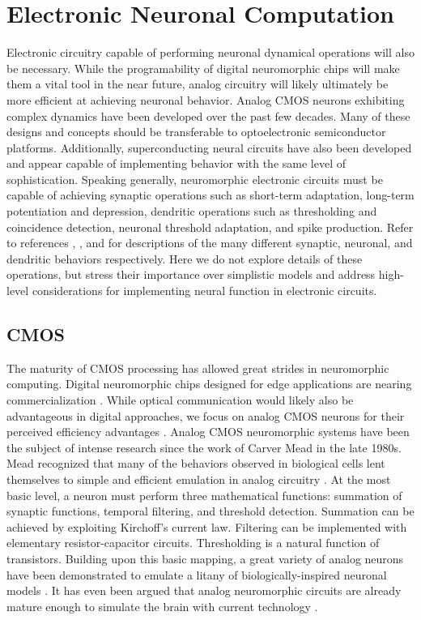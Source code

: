 \documentclass[twocolumn]{article}
\begin{document}
\section{\label{sec:soma}Electronic Neuronal Computation}
Electronic circuitry capable of performing neuronal dynamical operations will also be necessary. While the programability of digital neuromorphic chips will make them a vital tool in the near future, analog circuitry will likely ultimately be more efficient at achieving neuronal behavior. Analog CMOS neurons exhibiting complex dynamics have been developed over the past few decades. Many of these designs and concepts should be transferable to optoelectronic semiconductor platforms. Additionally, superconducting neural circuits have also been developed and appear capable of implementing behavior with the same level of sophistication. Speaking generally, neuromorphic electronic circuits must be capable of achieving synaptic operations such as short-term adaptation, long-term potentiation and depression, dendritic operations such as thresholding and coincidence detection, neuronal threshold adaptation, and spike production. Refer to references \cite{citri2008synaptic}, \cite{miller2019combined, zenke2013synaptic}, and \cite{payeur2019classes} for descriptions of the many different synaptic, neuronal, and dendritic behaviors respectively. Here we do not explore details of these operations, but stress their importance over simplistic models and address high-level considerations for implementing neural function in electronic circuits. 

\subsection{CMOS}
The maturity of CMOS processing has allowed great strides in neuromorphic computing. Digital neuromorphic chips designed for edge applications are nearing commercialization \cite{davies2018loihi, merolla2014million}. While optical communication would likely also be advantageous in digital approaches, we focus on analog CMOS neurons for their perceived efficiency advantages \cite{rajendran2012specifications, mead1990neuromorphic}. Analog CMOS neuromorphic systems have been the subject of intense research since the work of Carver Mead in the late 1980s. Mead recognized that many of the behaviors observed in biological cells lent themselves to simple and efficient emulation in analog circuitry \cite{mead1990neuromorphic}. At the most basic level, a neuron must perform three mathematical functions: summation of synaptic functions, temporal filtering, and threshold detection. Summation can be achieved by exploiting Kirchoff's current law. Filtering can be implemented with elementary resistor-capacitor circuits. Thresholding is a natural function of transistors. Building upon this basic mapping, a great variety of analog neurons have been demonstrated to emulate a litany of biologically-inspired neuronal models \cite{indiveri2011neuromorphic,lide2015}. It has even been argued that analog neuromorphic circuits are already mature enough to simulate the brain with current technology \cite{hasler2017special}.
\end{document}
